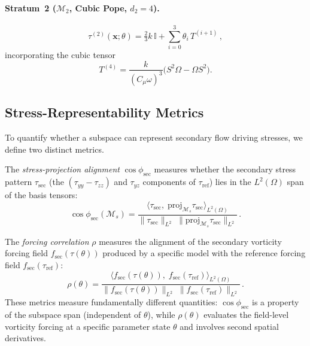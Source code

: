 \documentclass[preprint,aps,prb,longbibliography,superscriptaddress]{revtex4-2}
\newcommand{\bx}{\mathbf{x}}
\newcommand{\fsec}{f_{\text{sec}}}
\newcommand{\tref}{\tau_{\text{ref}}}
\newcommand{\id}{\mathbb{I}}
\begin{document}
\paragraph{Stratum~2 ($\mathcal{M}_2$, Cubic Pope, $d_2 = 4$).}
\begin{equation}\label{eq:stratum2}
  \tau^{(2)}(\bx;\theta) = \tfrac{2}{3}k\,\id
  + \sum_{i=0}^{3} \theta_i\, T^{(i+1)}\,,
\end{equation}
incorporating the cubic tensor
\begin{equation}\label{eq:T4}
  T^{(4)} = \frac{k}{(C_\mu\omega)^3}
    \bigl(S^2\Omega - \Omega S^2\bigr).
\end{equation}

\subsection{Stress-Representability Metrics}
\label{sec:representability}

To quantify whether a subspace can represent secondary flow driving stresses,
we define two distinct metrics.

The \emph{stress-projection alignment} $\cos\phi_{\mathrm{sec}}$ measures
whether the secondary stress pattern $\tau_{\mathrm{sec}}$ (the
$(\tau_{yy}-\tau_{zz})$ and $\tau_{yz}$ components of $\tref$) lies in the
$L^2(\Omega)$ span of the basis tensors:
\begin{equation}\label{eq:controllability}
  \cos\phi_{\mathrm{sec}}(\mathcal{M}_s) =
  \frac{\langle \tau_{\mathrm{sec}},\;
        \mathrm{proj}_{\mathcal{M}_s}\tau_{\mathrm{sec}}
        \rangle_{L^2(\Omega)}}
       {\|\tau_{\mathrm{sec}}\|_{L^2}\;
        \|\mathrm{proj}_{\mathcal{M}_s}\tau_{\mathrm{sec}}\|_{L^2}}\,.
\end{equation}

The \emph{forcing correlation} $\rho$ measures the alignment of the secondary
vorticity forcing field $\fsec(\tau(\theta))$ produced by a specific model with
the reference forcing field $\fsec(\tref)$:
\begin{equation}\label{eq:rho}
  \rho(\theta) =
  \frac{\langle \fsec(\tau(\theta)),\;
        \fsec(\tref) \rangle_{L^2(\Omega)}}
       {\|\fsec(\tau(\theta))\|_{L^2}\;
        \|\fsec(\tref)\|_{L^2}}\,.
\end{equation}
These metrics measure fundamentally different quantities: $\cos\phi_{\mathrm{sec}}$
is a property of the subspace span (independent of $\theta$), while $\rho(\theta)$
evaluates the field-level vorticity forcing at a specific parameter state $\theta$
and involves second spatial derivatives.
\end{document}
